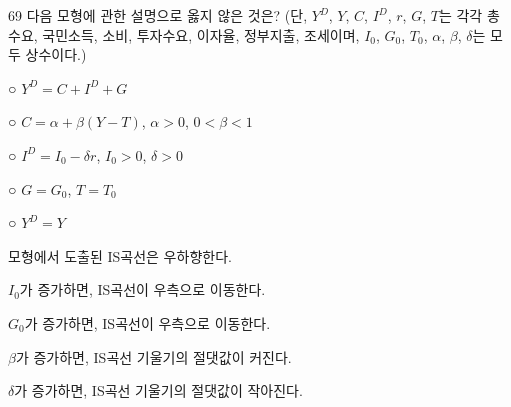 \begin{question}{69}
다음 모형에 관한 설명으로 옳지 않은 것은? (단, $Y^D$, $Y$, $C$, $I^D$, $r$, $G$, $T$는 각각 총수요, 국민소득, 소비, 투자수요, 이자율, 정부지출, 조세이며, $I_0$, $G_0$, $T_0$, $\alpha$, $\beta$, $\delta$는 모두 상수이다.)
\begin{framedtext}
○ $Y^D = C + I^D + G$ \par
○ $C = \alpha + \beta(Y - T)$, \quad $\alpha > 0$, \quad $0 < \beta < 1$ \par
○ $I^D = I_0 - \delta r$, \quad $I_0 > 0$, \quad $\delta > 0$ \par
○ $G = G_0$, \quad $T = T_0$ \par
○ $Y^D = Y$ \par
\end{framedtext}
\begin{choices}
  \item 모형에서 도출된 IS곡선은 우하향한다.
  \item $I_0$가 증가하면, IS곡선이 우측으로 이동한다.
  \item $G_0$가 증가하면, IS곡선이 우측으로 이동한다.
  \item $\beta$가 증가하면, IS곡선 기울기의 절댓값이 커진다.
  \item $\delta$가 증가하면, IS곡선 기울기의 절댓값이 작아진다.
\end{choices}
\end{question}
